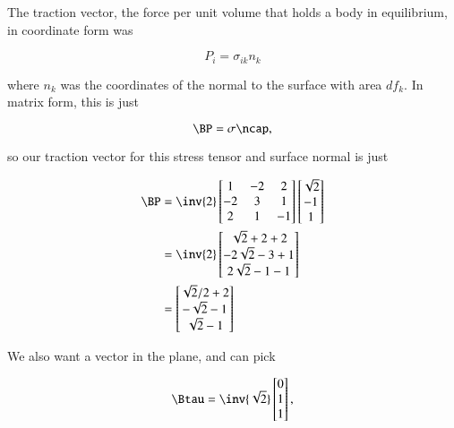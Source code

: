 \begin{Answer}[ref={problem:continuumProblemSet1:q3}]
The traction vector, the force per unit volume that holds a body in equilibrium, in coordinate form was

\begin{equation}\label{eqn:continuumProblemSet1:410}
P_i = \sigma_{ik} n_k
\end{equation}

where $n_k$ was the coordinates of the normal to the surface with area $df_k$.  In matrix form, this is just

\begin{equation}\label{eqn:continuumProblemSet1:430}
\BP = \sigma \ncap,
\end{equation}

so our traction vector for this stress tensor and surface normal is just

\begin{align*}
\BP &=
\inv{2}
\begin{bmatrix}
1 & -2 & 2 \\
-2 & 3 & 1 \\
2 & 1 & -1
\end{bmatrix}
\begin{bmatrix}
\sqrt{2} \\
-1 \\
1
\end{bmatrix} \\
&=
\inv{2}
\begin{bmatrix}
\sqrt{2} + 2 + 2 \\
-2\sqrt{2} - 3 + 1 \\
2\sqrt{2} - 1 -1
\end{bmatrix} \\
&=
\begin{bmatrix}
\sqrt{2}/2 + 2 \\
-\sqrt{2} -1 \\
\sqrt{2} - 1
\end{bmatrix}
\end{align*}

We also want a vector in the plane, and can pick

\begin{equation}\label{eqn:continuumProblemSet1:450}
\Btau = 
\inv{\sqrt{2}}
\begin{bmatrix}
0 \\
1 \\
1
\end{bmatrix},
\end{equation}


\end{Answer}
